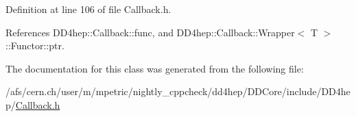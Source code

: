 Definition at line 106 of file Callback.h.

References DD4hep::Callback::func, and DD4hep::Callback::Wrapper$<$ T $>$::Functor::ptr.

The documentation for this class was generated from the following file:\begin{DoxyCompactItemize}
\item 
/afs/cern.ch/user/m/mpetric/nightly\_\-cppcheck/dd4hep/DDCore/include/DD4hep/\hyperlink{_callback_8h}{Callback.h}\end{DoxyCompactItemize}
